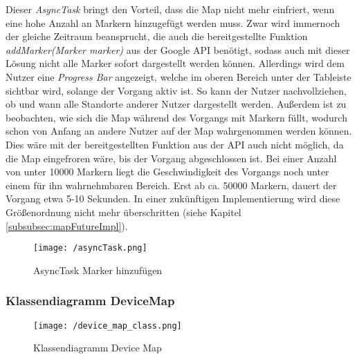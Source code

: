 Dieser \textit{AsyncTask} bringt den Vorteil, dass die Map nicht mehr einfriert, wenn eine hohe Anzahl an Markern hinzugefügt werden muss. Zwar wird immernoch der gleiche Zeitraum beansprucht, die auch die bereitgestellte Funktion \textit{addMarker(Marker marker)} aus der Google API benötigt, sodass auch mit dieser Lösung nicht alle Marker sofort dargestellt werden können. Allerdings wird dem Nutzer eine \textit{Progress Bar} angezeigt, welche im oberen Bereich unter der Tableiste sichtbar wird, solange der Vorgang aktiv ist. So kann der Nutzer nachvollziehen, ob und wann alle Standorte anderer Nutzer dargestellt werden. Außerdem ist zu beobachten, wie sich die Map während des Vorgangs mit Markern füllt, wodurch schon von Anfang an andere Nutzer auf der Map wahrgenommen werden können. Dies wäre mit der bereitgestellten Funktion aus der API auch nicht möglich, da die Map eingefroren wäre, bis der Vorgang abgeschlossen ist.
Bei einer Anzahl von unter 10000 Markern liegt die Geschwindigkeit des Vorgangs noch unter einem für ihn wahrnehmbaren Bereich. Erst ab ca. 50000 Markern, dauert der Vorgang etwa 5-10 Sekunden. In einer zukünftigen Implementierung wird diese Größenordnung nicht mehr überschritten (siehe Kapitel \ref{subsubsec:mapFutureImpl}).

\begin{figure}[H]
\centering
\texttt{[image: /asyncTask.png]}
\caption[User Interface: Klassendiagramm Device Map]{AsyncTask Marker hinzufügen}
\label{fig:asyncTask}
\end{figure}

\subsubsection{Klassendiagramm DeviceMap}
\begin{figure}[H]
\centering
\texttt{[image: /device\_map\_class.png]}
\caption[User Interface: Klassendiagramm Device Map]{Klassendiagramm Device Map}
\label{fig:deviceMapClass}
\end{figure}

